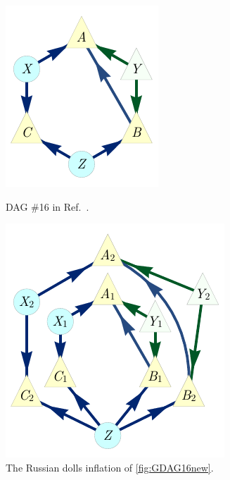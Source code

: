 \documentclass[aps,english,10pt,superscriptaddress,onecolumn,twoside,longbibliography,pra,floatfix,fleqn,nofootinbib]{revtex4-1}%
\theoremstyle{definition}
\begin{document}
\begin{figure}[htb]
\centering
\begin{minipage}[t]{0.4\linewidth}
\centering
\includegraphics[scale=1]{scen16DAG.pdf}
\caption{DAG \#16 in Ref.~\cite{pusey2014gdag}.}\label{fig:GDAG16new}
\end{minipage}
\hfill
\begin{minipage}[t]{0.5\linewidth}
\centering
\includegraphics[scale=1]{scen16InflationDAGv2.pdf}
\caption{The Russian dolls inflation of \cref{fig:GDAG16new}.}\label{fig:Inflated16new}
\end{minipage}
\end{figure}
\end{document}
